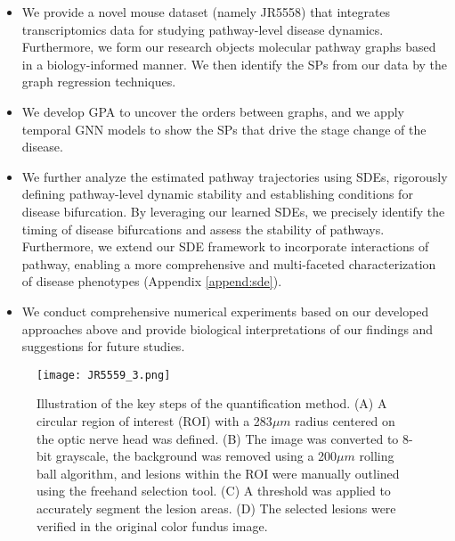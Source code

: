 \documentclass{article} %
\begin{document}
\begin{itemize}
    \item We provide a novel mouse dataset (namely JR5558) that integrates transcriptomics data for studying pathway-level disease dynamics. Furthermore, we form our research objects molecular pathway graphs based in a biology-informed manner. We then identify the SPs from our data by the graph regression techniques. 

    \item We develop GPA to uncover the orders between graphs, and we apply temporal GNN models to show the SPs that drive the stage change of the disease. 

   \item We further analyze the estimated pathway trajectories using SDEs, rigorously defining pathway-level dynamic stability and establishing conditions for disease bifurcation. By leveraging our learned SDEs, we precisely identify the timing of disease bifurcations and assess the stability of pathways. Furthermore, we extend our SDE framework to incorporate interactions of pathway, enabling a more comprehensive and multi-faceted characterization of disease phenotypes (Appendix \ref{append:sde}).

    \item We conduct comprehensive numerical experiments based on our developed approaches above and provide biological interpretations of our findings and suggestions for future studies. 
\end{itemize}





\begin{figure}[t]
\centering
\texttt{[image: JR5559\_3.png]} 
\caption{Illustration of the key steps of the quantification method. 
    (A) A circular region of interest (ROI) with a 283$\mu m$ radius centered on the optic nerve head was defined. (B) The image was converted to 8-bit grayscale, the background was removed using a 200$\mu m$ rolling ball algorithm, and lesions within the ROI were manually outlined using the freehand selection tool. (C) A threshold was applied to accurately segment the lesion areas. (D) The selected lesions were verified in the original color fundus image.}
\label{fig:02_fundus}
\end{figure}
\end{document}

